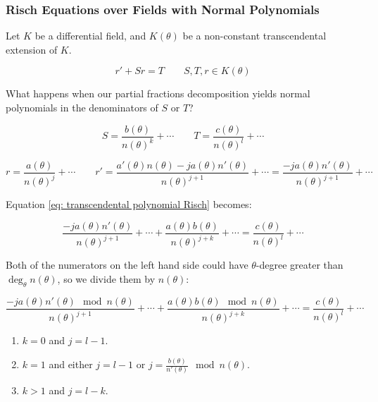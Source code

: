 \documentclass[aspectratio=169,dvipsnames]{beamer}
\begin{document}
\begin{frame}
\frametitle{Risch Equations over Fields with Normal Polynomials}
\tiny
Let $K$ be a differential field, and $K(\theta)$ be a
non-constant transcendental extension of $K$.

\begin{equation}
\label{eq: transcendental polynomial Risch}
r' + S r = T \qquad S,T,r \in K(\theta)
\end{equation}

What happens when our partial
fractions decomposition yields normal polynomials
in the denominators of $S$ or $T$?

$$S = \frac{b(\theta)}{n(\theta)^k} + \cdots
\qquad T = \frac{c(\theta)}{n(\theta)^l} + \cdots$$

$$r = \frac{a(\theta)}{n(\theta)^j} + \cdots  \qquad
r' = \frac{a'(\theta)n(\theta)-ja(\theta)n'(\theta)}{n(\theta)^{j+1}} + \cdots = \frac{-ja(\theta)n'(\theta)}{n(\theta)^{j+1}} + \cdots$$

Equation \ref{eq: transcendental polynomial Risch} becomes:

$$\frac{-ja(\theta)n'(\theta)}{n(\theta)^{j+1}} + \cdots + \frac{a(\theta) b(\theta)}{n(\theta)^{j+k}} + \cdots = \frac{c(\theta)}{n(\theta)^l} + \cdots$$

Both of the numerators on the left hand side could have $\theta$-degree greater than $\deg_\theta n(\theta)$,
so we divide them by $n(\theta)$:



$$\frac{-ja(\theta)n'(\theta) \mod n(\theta)}{n(\theta)^{j+1}} + \cdots + \frac{a(\theta)b(\theta) \mod n(\theta)}{n(\theta)^{j+k}} + \cdots = \frac{c(\theta)}{n(\theta)^l} + \cdots$$

\begin{enumerate}

\item $k=0$ and $j = l-1$.

\item $k=1$ and either $j=l-1$ or $j = \frac{b(\theta)}{n'(\theta)} \mod n(\theta)$.

\item $k>1$ and $j=l-k$.

\end{enumerate}

\end{frame}
\end{document}
